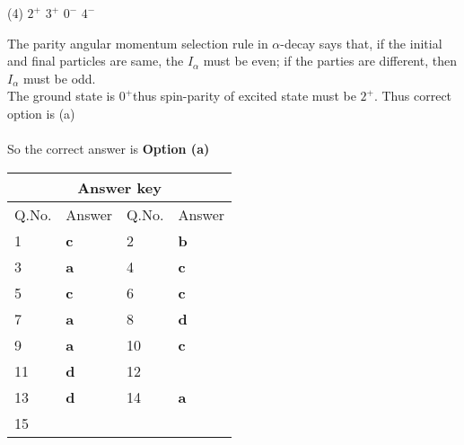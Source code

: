 \begin{enumerate}
	\begin{tasks}(4)
		\task[\textbf{a.}]$2^{+}$
		\task[\textbf{b.}]$3^{+}$
		\task[\textbf{c.}]$0^{-}$
		\task[\textbf{d.}]$4^{-}$ 
	\end{tasks}
	\begin{answer}
		The parity angular momentum selection rule in $\alpha$-decay says that, if the initial and final particles are same, the $I_\alpha$ must be even; if the parties are different, then $I_\alpha$ must be odd.\\	The ground state is $0^{+}$thus spin-parity of excited state must be $2^{+}$. Thus correct option is (a)\\\\
		So the correct answer is \textbf{Option (a)}
	\end{answer}
\end{enumerate}
\setlength\arrayrulewidth{1pt}
\begin{table}[H]
	\centering
	\begin{tabular}{|p{1.5cm}|p{1.5cm}||p{1.5cm}|p{1.5cm}|}
		\hline
		\multicolumn{4}{|c|}{\textbf{Answer key}}\\\hline\hline
		\rowcolor{ocrel}Q.No.&Answer&Q.No.&Answer\\\hline
		1&\textbf{c} &2&\textbf{b}\\\hline 
		3&\textbf{a} &4&\textbf{c} \\\hline
		5&\textbf{c} &6&\textbf{c} \\\hline
		7&\textbf{a}&8&\textbf{d}\\\hline
		9&\textbf{a}&10&\textbf{c}\\\hline
		11&\textbf{d} &12&\textbf{}\\\hline
		13&\textbf{d}&14&\textbf{a}\\\hline
		15&\textbf{}& &\\\hline
		
	\end{tabular}
\end{table}




